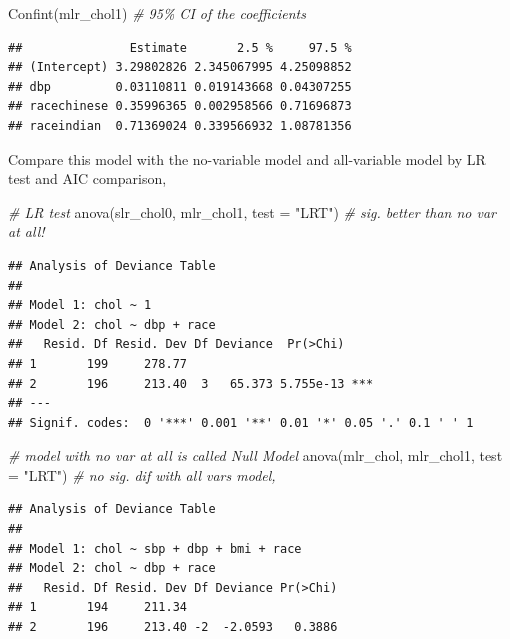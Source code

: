\documentclass[
]{book}
\makeatletter
\newenvironment{Shaded}{\begin{snugshade}}{\end{snugshade}}
\newcommand{\AttributeTok}[1]{\textcolor[rgb]{0.61,0.61,0.61}{#1}}
\newcommand{\CommentTok}[1]{\textcolor[rgb]{0.37,0.37,0.37}{\textit{#1}}}
\newcommand{\FunctionTok}[1]{\textcolor[rgb]{0,0,0}{#1}}
\newcommand{\NormalTok}[1]{#1}
\newcommand{\StringTok}[1]{\textcolor[rgb]{0.5,0.5,0.5}{#1}}
\newenvironment{kframe}{%
\medskip{}
\setlength{\fboxsep}{.8em}
 \def\at@end@of@kframe{}%
 \ifinner\ifhmode%
  \def\at@end@of@kframe{\end{minipage}}%
  \begin{minipage}{\columnwidth}%
 \fi\fi%
 \def\FrameCommand##1{\hskip\@totalleftmargin \hskip-\fboxsep
 \colorbox{shadecolor}{##1}\hskip-\fboxsep
     \hskip-\linewidth \hskip-\@totalleftmargin \hskip\columnwidth}%
 \MakeFramed {\advance\hsize-\width
   \@totalleftmargin\z@ \linewidth\hsize
   \@setminipage}}%
 {\par\unskip\endMakeFramed%
 \at@end@of@kframe}
\renewenvironment{Shaded}{\begin{kframe}}{\end{kframe}}
\makeatother
\begin{document}
\begin{Shaded}
\begin{Highlighting}[]
\FunctionTok{Confint}\NormalTok{(mlr\_chol1)  }\CommentTok{\# 95\% CI of the coefficients}
\end{Highlighting}
\end{Shaded}

\begin{verbatim}
##               Estimate       2.5 %     97.5 %
## (Intercept) 3.29802826 2.345067995 4.25098852
## dbp         0.03110811 0.019143668 0.04307255
## racechinese 0.35996365 0.002958566 0.71696873
## raceindian  0.71369024 0.339566932 1.08781356
\end{verbatim}

Compare this model with the no-variable model and all-variable model by LR test and AIC comparison,

\begin{Shaded}
\begin{Highlighting}[]
\CommentTok{\# LR test}
\FunctionTok{anova}\NormalTok{(slr\_chol0, mlr\_chol1, }\AttributeTok{test =} \StringTok{"LRT"}\NormalTok{)  }\CommentTok{\# sig. better than no var at all!}
\end{Highlighting}
\end{Shaded}

\begin{verbatim}
## Analysis of Deviance Table
## 
## Model 1: chol ~ 1
## Model 2: chol ~ dbp + race
##   Resid. Df Resid. Dev Df Deviance  Pr(>Chi)    
## 1       199     278.77                          
## 2       196     213.40  3   65.373 5.755e-13 ***
## ---
## Signif. codes:  0 '***' 0.001 '**' 0.01 '*' 0.05 '.' 0.1 ' ' 1
\end{verbatim}

\begin{Shaded}
\begin{Highlighting}[]
\CommentTok{\# model with no var at all is called Null Model}
\FunctionTok{anova}\NormalTok{(mlr\_chol, mlr\_chol1, }\AttributeTok{test =} \StringTok{"LRT"}\NormalTok{)  }\CommentTok{\# no sig. dif with all vars model,}
\end{Highlighting}
\end{Shaded}

\begin{verbatim}
## Analysis of Deviance Table
## 
## Model 1: chol ~ sbp + dbp + bmi + race
## Model 2: chol ~ dbp + race
##   Resid. Df Resid. Dev Df Deviance Pr(>Chi)
## 1       194     211.34                     
## 2       196     213.40 -2  -2.0593   0.3886
\end{verbatim}
\end{document}
